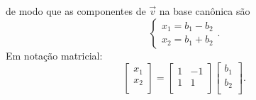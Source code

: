 \documentclass[../livro.tex]{subfiles}  %
\begin{document}
\begin{remark}
\[	\] de modo que as componentes de $\vec{v}$ na base canônica são
	\[
	\left\{
	\begin{array}{ll}
	x_1 = b_1 - b_2 \\
	x_2 = b_1 + b_2
	\end{array}
	\right..
	\] Em notação matricial:
	\[
	\left[
	\begin{array}{c}
	x_1 \\
	x_2 \\
	\end{array}
	\right] = 
	\left[
	\begin{array}{cc}
	1 & -1 \\
	1 &  1 \\
	\end{array}
	\right]
	\left[
	\begin{array}{c}
	b_1  \\
	b_2  \\
	\end{array}
	\right].
	\]
\end{remark}
\end{document}
